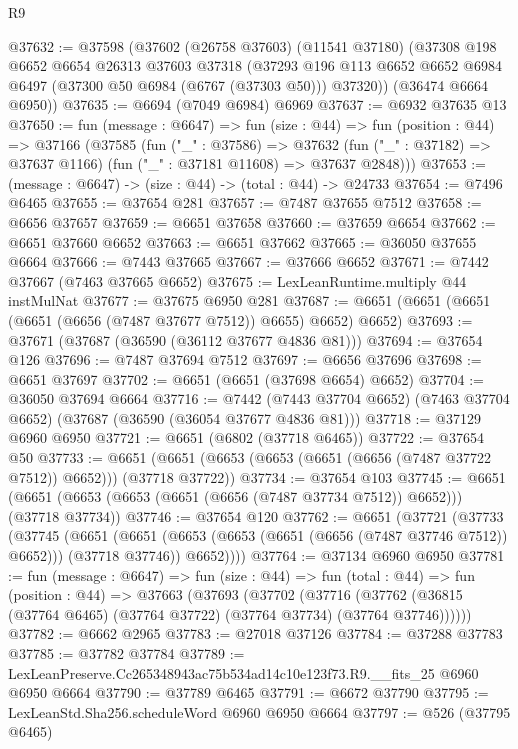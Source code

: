 \begin{lexlean}{R9}
\begin{coremodule}
@37632 := @37598
    (@37602
      (@26758 @37603)
      (@11541 @37180)
      (@37308
        @198
        @6652
        @6654
        @26313
        @37603
        @37318
        (@37293 @196 @113 @6652 @6652 @6984 @6497 (@37300 @50 @6984 (@6767 (@37303 @50))) @37320))
      (@36474 @6664 @6950))
@37635 := @6694 (@7049 @6984) @6969
@37637 := @6932 @37635 @13
@37650 := fun (message : @6647) =>
  fun (size : @44) =>
  fun (position : @44) =>
  @37166
    (@37585
      (fun ("_" : @37586) =>
      @37632 (fun ("_" : @37182) => @37637 @1166) (fun ("_" : @37181 @11608) => @37637 @2848)))
@37653 := (message : @6647) -> (size : @44) -> (total : @44) -> @24733
@37654 := @7496 @6465
@37655 := @37654 @281
@37657 := @7487 @37655 @7512
@37658 := @6656 @37657
@37659 := @6651 @37658
@37660 := @37659 @6654
@37662 := @6651 @37660 @6652
@37663 := @6651 @37662
@37665 := @36050 @37655 @6664
@37666 := @7443 @37665
@37667 := @37666 @6652
@37671 := @7442 @37667 (@7463 @37665 @6652)
@37675 := LexLeanRuntime.multiply @44 instMulNat
@37677 := @37675 @6950 @281
@37687 := @6651 (@6651 (@6651 (@6651 (@6656 (@7487 @37677 @7512)) @6655) @6652) @6652)
@37693 := @37671 (@37687 (@36590 (@36112 @37677 @4836 @81)))
@37694 := @37654 @126
@37696 := @7487 @37694 @7512
@37697 := @6656 @37696
@37698 := @6651 @37697
@37702 := @6651 (@6651 (@37698 @6654) @6652)
@37704 := @36050 @37694 @6664
@37716 := @7442
    (@7443 @37704 @6652)
    (@7463 @37704 @6652)
    (@37687 (@36590 (@36054 @37677 @4836 @81)))
@37718 := @37129 @6960 @6950
@37721 := @6651 (@6802 (@37718 @6465))
@37722 := @37654 @50
@37733 := @6651 (@6651 (@6653 (@6653 (@6651 (@6656 (@7487 @37722 @7512)) @6652))) (@37718 @37722))
@37734 := @37654 @103
@37745 := @6651 (@6651 (@6653 (@6653 (@6651 (@6656 (@7487 @37734 @7512)) @6652))) (@37718 @37734))
@37746 := @37654 @120
@37762 := @6651
    (@37721
      (@37733
        (@37745
          (@6651
            (@6651 (@6653 (@6653 (@6651 (@6656 (@7487 @37746 @7512)) @6652))) (@37718 @37746))
            @6652))))
@37764 := @37134 @6960 @6950
@37781 := fun (message : @6647) =>
  fun (size : @44) =>
  fun (total : @44) =>
  fun (position : @44) =>
  @37663
    (@37693
      (@37702
        (@37716 (@37762 (@36815 (@37764 @6465) (@37764 @37722) (@37764 @37734) (@37764 @37746))))))
@37782 := @6662 @2965
@37783 := @27018 @37126
@37784 := @37288 @37783
@37785 := @37782 @37784
@37789 := LexLeanPreserve.Cc265348943ac75b534ad14c10e123f73.R9.__fits_25 @6960 @6950 @6664
@37790 := @37789 @6465
@37791 := @6672 @37790
@37795 := LexLeanStd.Sha256.scheduleWord @6960 @6950 @6664
@37797 := @526 (@37795 @6465)

\end{coremodule}
\end{lexlean}

